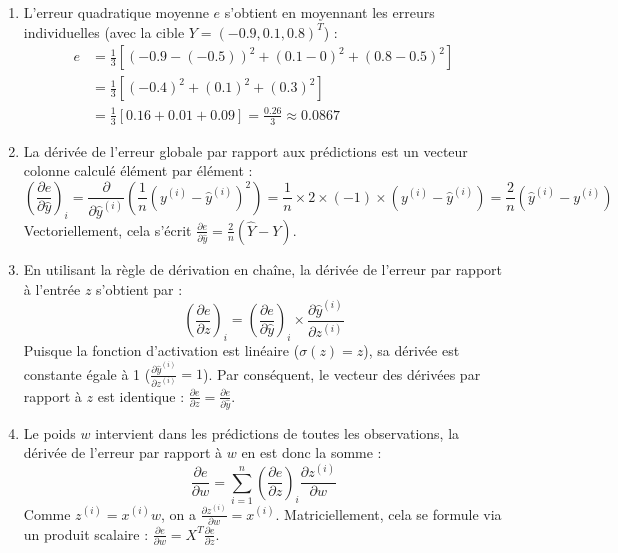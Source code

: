 \documentclass[]{../exercices}
\begin{document}
\begin{solution}
\begin{enumerate}
    \item L'erreur quadratique moyenne $e$ s'obtient en moyennant les erreurs individuelles (avec la cible $Y = (-0.9, 0.1, 0.8)^T$) :
    \begin{align*}
        e &= \frac{1}{3} \left[ (-0.9 - (-0.5))^2 + (0.1 - 0)^2 + (0.8 - 0.5)^2 \right] \\
        &= \frac{1}{3} \left[ (-0.4)^2 + (0.1)^2 + (0.3)^2 \right] \\
        &= \frac{1}{3}[0.16 + 0.01 + 0.09] = \frac{0.26}{3} \approx 0.0867
    \end{align*}

    \item La dérivée de l'erreur globale par rapport aux prédictions est un vecteur colonne calculé élément par élément :
    \begin{equation*}
        \left(\frac{\partial e}{\partial \hat{y}}\right)_i = \frac{\partial}{\partial \hat{y}^{(i)}} \left( \frac{1}{n} (y^{(i)} - \hat{y}^{(i)})^2 \right) = \frac{1}{n} \times 2 \times (-1) \times (y^{(i)} - \hat{y}^{(i)}) = \frac{2}{n} (\hat{y}^{(i)} - y^{(i)})
    \end{equation*}
    Vectoriellement, cela s'écrit $\frac{\partial e}{\partial \hat{y}} = \frac{2}{n} (\hat{Y} - Y)$.

    \item En utilisant la règle de dérivation en chaîne, la dérivée de l'erreur par rapport à l'entrée $z$ s'obtient par :
    \begin{equation*}
        \left(\frac{\partial e}{\partial z}\right)_i = \left(\frac{\partial e}{\partial \hat{y}}\right)_i \times \frac{\partial \hat{y}^{(i)}}{\partial z^{(i)}}
    \end{equation*}
    Puisque la fonction d'activation est linéaire ($\sigma(z) = z$), sa dérivée est constante égale à 1 ($\frac{\partial \hat{y}^{(i)}}{\partial z^{(i)}} = 1$). Par conséquent, le vecteur des dérivées par rapport à $z$ est identique :
    $\frac{\partial e}{\partial z} = \frac{\partial e}{\partial \hat{y}}$.

    \item Le poids $w$ intervient dans les prédictions de toutes les observations, la dérivée de l'erreur par rapport à $w$ en est donc la somme :
    \begin{equation*}
        \frac{\partial e}{\partial w} = \sum_{i=1}^n \left(\frac{\partial e}{\partial z}\right)_i \frac{\partial z^{(i)}}{\partial w}
    \end{equation*}
    Comme $z^{(i)} = x^{(i)} w$, on a $\frac{\partial z^{(i)}}{\partial w} = x^{(i)}$. 
    Matriciellement, cela se formule via un produit scalaire : $\frac{\partial e}{\partial w} = X^T \frac{\partial e}{\partial z}$.


\end{enumerate}
\end{solution}
\end{document}
